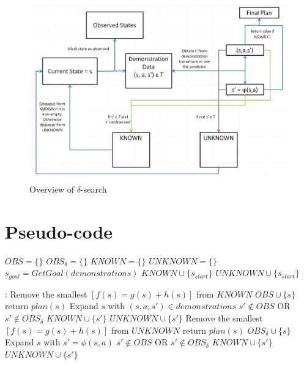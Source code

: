 \begin{figure}[t]
	\centering
	\includegraphics[width=\textwidth]{Figures/SearchSpecificFlowchart.png}
	\caption{Overview of $\delta$-search}
	\label{}
\end{figure}

\section{Pseudo-code}

\begin{algorithm}
	\begin{algorithmic}[1]
		 {}
		\State $OBS = \{\}$
		\State $OBS_{\delta} = \{\}$
		\State $KNOWN = \{\}$
		\State $UNKNOWN = \{\}$
		\State $s_{goal} = GetGoal(demonstrations)$
			\State $KNOWN \cup \{s_{start}\}$
		\Else
			\State $UNKNOWN \cup \{s_{start}\}$
		\EndIf
		
		:
				\State Remove the smallest $[f(s) = g(s) + h(s)]$ from $KNOWN$
				\State $OBS \cup \{s\}$
					return $plan(s)$ 
				\EndIf
				\State Expand $s$ with $(s,a,s') \in demonstrations$ \hfill $s' \not \in OBS$ OR $s' \not \in OBS_{\delta}$
					\State $KNOWN \cup \{s'\}$
				\EndIf
				\State $UNKNOWN \cup \{s'\}$
				\State Remove the smallest $[f(s) = g(s) + h(s)]$ from $UNKNOWN$
					return $plan(s)$
				\EndIf
				\State $OBS_{\delta} \cup \{s\}$
				\State Expand $s$ with $s' = \phi(s,a)$ \hspace{2cm}  $s' \not \in OBS$ OR $s' \not \in OBS_{\delta}$
					\State $KNOWN \cup \{s'\}$
				\EndIf
				\State $UNKNOWN \cup \{s'\}$	
			\EndIf
		\EndWhile
		\EndFunction
	\end{algorithmic}
\end{algorithm}

